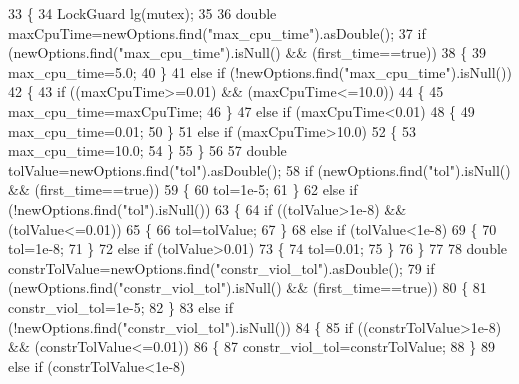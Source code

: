 \begin{DoxyCode}
33 \{
34     LockGuard lg(mutex);
35 
36     \textcolor{keywordtype}{double} maxCpuTime=newOptions.find(\textcolor{stringliteral}{"max\_cpu\_time"}).asDouble();
37     \textcolor{keywordflow}{if} (newOptions.find(\textcolor{stringliteral}{"max\_cpu\_time"}).isNull() && (first\_time==\textcolor{keyword}{true}))
38     \{
39         max_cpu_time=5.0;
40     \}
41     \textcolor{keywordflow}{else} \textcolor{keywordflow}{if} (!newOptions.find(\textcolor{stringliteral}{"max\_cpu\_time"}).isNull())
42     \{
43         \textcolor{keywordflow}{if} ((maxCpuTime>=0.01) && (maxCpuTime<=10.0))
44         \{
45             max_cpu_time=maxCpuTime;
46         \}
47         \textcolor{keywordflow}{else} \textcolor{keywordflow}{if} (maxCpuTime<0.01)
48         \{
49             max_cpu_time=0.01;
50         \}
51         \textcolor{keywordflow}{else} \textcolor{keywordflow}{if} (maxCpuTime>10.0)
52         \{
53             max_cpu_time=10.0;
54         \}
55     \}
56 
57     \textcolor{keywordtype}{double} tolValue=newOptions.find(\textcolor{stringliteral}{"tol"}).asDouble();
58     \textcolor{keywordflow}{if} (newOptions.find(\textcolor{stringliteral}{"tol"}).isNull() && (first\_time==\textcolor{keyword}{true}))
59     \{
60         tol=1e-5;
61     \}
62     \textcolor{keywordflow}{else} \textcolor{keywordflow}{if} (!newOptions.find(\textcolor{stringliteral}{"tol"}).isNull())
63     \{
64         \textcolor{keywordflow}{if} ((tolValue>1e-8) && (tolValue<=0.01))
65         \{
66             tol=tolValue;
67         \}
68         \textcolor{keywordflow}{else} \textcolor{keywordflow}{if} (tolValue<1e-8)
69         \{
70             tol=1e-8;
71         \}
72         \textcolor{keywordflow}{else} \textcolor{keywordflow}{if} (tolValue>0.01)
73         \{
74             tol=0.01;
75         \}
76     \}
77 
78     \textcolor{keywordtype}{double} constrTolValue=newOptions.find(\textcolor{stringliteral}{"constr\_viol\_tol"}).asDouble();
79     \textcolor{keywordflow}{if} (newOptions.find(\textcolor{stringliteral}{"constr\_viol\_tol"}).isNull() && (first\_time==\textcolor{keyword}{true}))
80     \{
81         constr_viol_tol=1e-5;
82     \}
83     \textcolor{keywordflow}{else} \textcolor{keywordflow}{if} (!newOptions.find(\textcolor{stringliteral}{"constr\_viol\_tol"}).isNull())
84     \{
85         \textcolor{keywordflow}{if} ((constrTolValue>1e-8) && (constrTolValue<=0.01))
86         \{
87             constr_viol_tol=constrTolValue;
88         \}
89         \textcolor{keywordflow}{else} \textcolor{keywordflow}{if} (constrTolValue<1e-8)

\end{DoxyCode}
